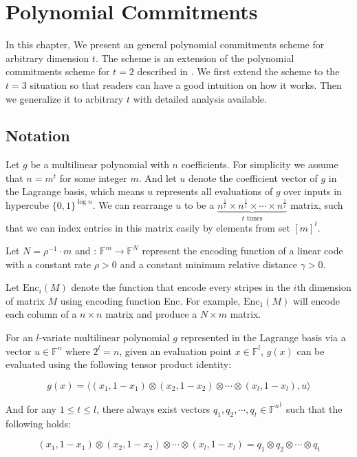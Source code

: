 \chapter{Polynomial Commitments}

In this chapter, We present an general polynomial commitments scheme for arbitrary dimension $t$. The scheme is an extension of the polynomial commitments scheme for $t=2$ described in \cite{brakedown}. We first extend the scheme to the $t=3$ situation so that readers can have a good intuition on how it works. Then we generalize it to arbitrary $t$ with detailed analysis available.

\section{Notation}

Let $g$ be a multilinear polynomial with $n$ coefficients. For simplicity we assume that $n = m^t$ for some integer $m$. And let $u$ denote the coefficient vector of $g$ in the Lagrange basis, which means $u$ represents all evaluations of $g$ over inputs in hypercube $\{0, 1\}^{\log n}$. 
We can rearrange $u$ to be a $\underbrace{n^{\frac{1}{t}} \times n^{\frac{1}{t}} \times \cdots \times n^{\frac{1}{t}}}_{t \text{ times}}$ matrix, such that we can index entries in this matrix easily by elements from set $[m]^t$.

Let $N = \rho^{-1} \cdot m$ and : $\mathbb{F}^m \rightarrow \mathbb{F}^N$ represent the encoding function of a linear code with a constant rate $\rho > 0$ and a constant minimum relative distance $\gamma > 0$.

Let $\text{Enc}_i(M)$ denote the function that encode every stripes in the $i$th dimension of matrix $M$ using encoding function Enc. For example, $\text{Enc}_1(M)$ will encode each column of a $n \times n $ matrix and produce a $N \times m$ matrix.

\begin{lemma}
\label{lemma:petq}

For an $l$-variate multilinear polynomial $g$ represented in the Lagrange basis via a vector $u \in \mathbb{F}^{n}$ where $2^l = n$, given an evaluation point $x \in \mathbb{F}^l$, $g(x)$ can be evaluated using the following tensor product identity: 

\[
    g(x) = \langle (x_1, 1-x_1) \otimes (x_2, 1-x_2) \otimes \cdots \otimes (x_l, 1-x_l) , u \rangle
\]

And for any $ 1 \le t  \le l$, there always exist vectors $q_1, q_2, \cdots , q_t \in \mathbb{F}^{n^{\frac{1}{t}}}$ such that the following holds:

\[
    (x_1, 1-x_1) \otimes (x_2, 1-x_2) \otimes \cdots \otimes (x_l, 1-x_l) = q_1 \otimes q_2 \otimes \cdots \otimes q_t
\]

\end{lemma}

